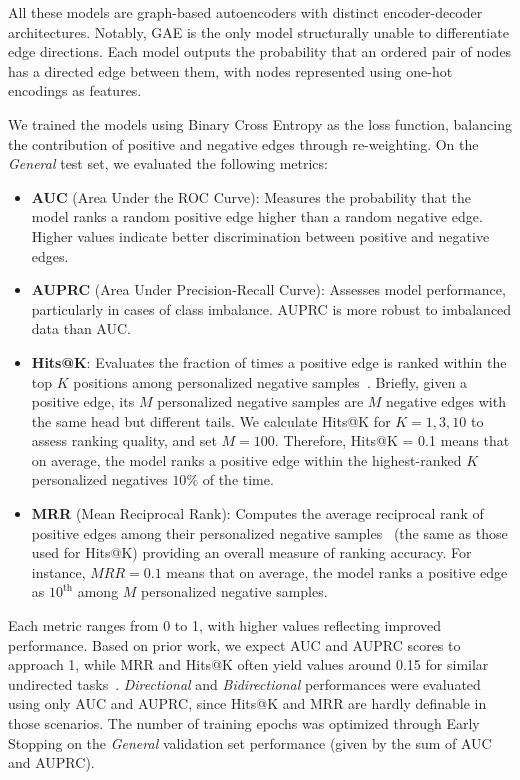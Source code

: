 All these models are graph-based autoencoders with distinct encoder-decoder architectures.
Notably, GAE is the only model structurally unable to differentiate edge directions.
Each model outputs the probability that an ordered pair of nodes has a directed edge between them,
with nodes represented using one-hot encodings as features.

We trained the models using Binary Cross Entropy as the loss function, balancing the contribution
of positive and negative edges through re-weighting. On the \emph{General} test set, we evaluated
the following metrics:

\begin{itemize}
    \item \textbf{AUC} (Area Under the ROC Curve): Measures the probability that the model ranks a
    random positive edge higher than a random negative edge. Higher values indicate better
    discrimination between positive and negative edges.
    \item \textbf{AUPRC} (Area Under Precision-Recall Curve): Assesses model performance,
    particularly in cases of class imbalance. AUPRC is more robust to imbalanced data than AUC.
    \item \textbf{Hits@K}: Evaluates the fraction of times a positive edge is ranked within the
    top $K$ positions among personalized negative samples~\cite{Li2023}. Briefly, given a positive
    edge, its $M$ personalized negative samples are $M$ negative edges with the same head but
    different tails. We calculate Hits@K for $K = 1, 3, 10$ to assess ranking quality, and
    set $M = 100$. Therefore, Hits@K = 0.1 means that on average, the model ranks a positive
    edge within the highest-ranked $K$ personalized negatives $10\%$ of the time.
    \item \textbf{MRR} (Mean Reciprocal Rank): Computes the average reciprocal rank of positive
    edges among their personalized negative samples~\cite{Li2023} (the same as those used for Hits@K)
    providing an overall measure of ranking accuracy. For instance, $MRR = 0.1$ means that on average,
    the model ranks a positive edge as $10^{\text{th}}$ among $M$ personalized negative samples.
\end{itemize}

Each metric ranges from 0 to 1, with higher values reflecting improved performance.
Based on prior work, we expect AUC and AUPRC scores to approach 1, while MRR and Hits@K often
yield values around 0.15 for similar undirected tasks~\cite{Li2023}. \emph{Directional} and
\emph{Bidirectional} performances were evaluated using only AUC and AUPRC, since Hits@K and MRR
are hardly definable in those scenarios. The number of training epochs was optimized through
Early Stopping on the \emph{General} validation set performance (given by the sum of AUC and AUPRC).

